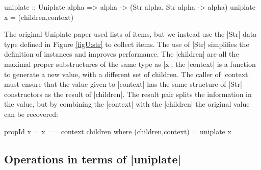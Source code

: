 \ignore\begin{code}
uniplate :: Uniplate alpha => alpha -> (Str alpha, Str alpha -> alpha)
uniplate x = (children,context)
\end{code}


The original Uniplate paper \cite{me:uniplate} used lists of items, but we instead use the |Str| data type defined in Figure \ref{figU:str} to collect items. The use of |Str| simplifies the definition of instances and improves performance. The |children| are all the maximal proper substructures of the same type as |x|; the |context| is a function to generate a new value, with a different set of children. The caller of |context| must ensure that the value given to |context| has the same structure of |Str| constructors as the result of |children|. The result pair splits the information in the value, but by combining the |context| with the |children| the original value can be recovered:

\begin{code}
propId x = x == context children
    where (children,context) = uniplate x
\end{code}

\subsection{Operations in terms of |uniplate|}
\label{secU:using_replacechildren}

